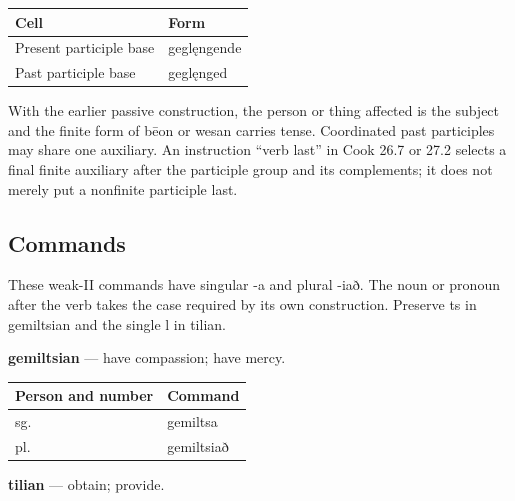 \par\begingroup
\fontsize{10.5}{13.2}\selectfont
\setlength{\LTleft}{0pt}\setlength{\LTright}{\fill}
\noindent
\begin{tabular}{@{}>{\raggedright\arraybackslash}p{71.54mm}>{\raggedright\arraybackslash}p{49.65mm}@{}}
\toprule
\textbf{Cell} & \textbf{Form} \\
\midrule
Present participle base & geglęngende \\
Past participle base & geglęnged \\
\bottomrule
\end{tabular}
\par\endgroup

With the earlier passive construction, the person or thing affected is the subject and the finite form of bēon or wesan carries tense. Coordinated past participles may share one auxiliary. An instruction “verb last” in Cook 26.7 or 27.2 selects a final finite auxiliary after the participle group and its complements; it does not merely put a nonfinite participle last.

\subsection*{Commands}

These weak-II commands have singular -a and plural -iað. The noun or pronoun after the verb takes the case required by its own construction. Preserve ts in gemiltsian and the single l in tilian.

\textbf{gemiltsian} — have compassion; have mercy.

\par\begingroup
\fontsize{10.5}{13.2}\selectfont
\setlength{\LTleft}{0pt}\setlength{\LTright}{\fill}
\noindent
\begin{tabular}{@{}>{\raggedright\arraybackslash}p{63.342mm}>{\raggedright\arraybackslash}p{57.846mm}@{}}
\toprule
\textbf{Person and number} & \textbf{Command} \\
\midrule
2 sg. & gemiltsa \\
2 pl. & gemiltsiað \\
\bottomrule
\end{tabular}
\par\endgroup
\textbf{tilian} — obtain; provide.

